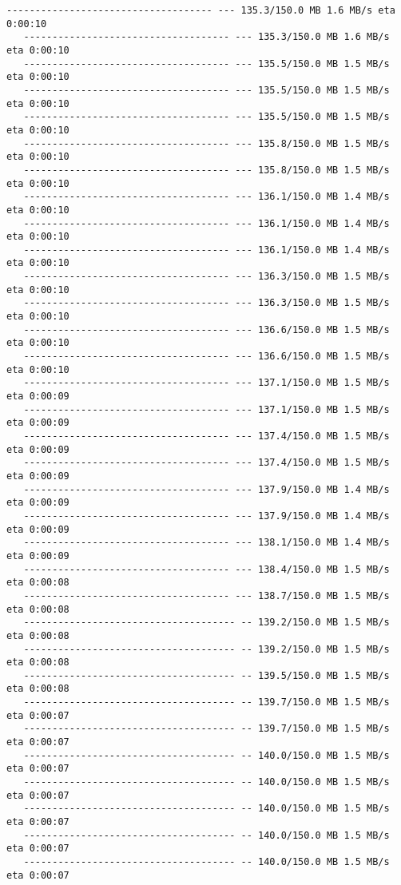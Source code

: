 \documentclass[11pt]{article}
\begin{document}
\begin{Verbatim}[commandchars=\\\{\}]
   ------------------------------------ --- 135.3/150.0 MB 1.6 MB/s eta 0:00:10
   ------------------------------------ --- 135.3/150.0 MB 1.6 MB/s eta 0:00:10
   ------------------------------------ --- 135.5/150.0 MB 1.5 MB/s eta 0:00:10
   ------------------------------------ --- 135.5/150.0 MB 1.5 MB/s eta 0:00:10
   ------------------------------------ --- 135.5/150.0 MB 1.5 MB/s eta 0:00:10
   ------------------------------------ --- 135.8/150.0 MB 1.5 MB/s eta 0:00:10
   ------------------------------------ --- 135.8/150.0 MB 1.5 MB/s eta 0:00:10
   ------------------------------------ --- 136.1/150.0 MB 1.4 MB/s eta 0:00:10
   ------------------------------------ --- 136.1/150.0 MB 1.4 MB/s eta 0:00:10
   ------------------------------------ --- 136.1/150.0 MB 1.4 MB/s eta 0:00:10
   ------------------------------------ --- 136.3/150.0 MB 1.5 MB/s eta 0:00:10
   ------------------------------------ --- 136.3/150.0 MB 1.5 MB/s eta 0:00:10
   ------------------------------------ --- 136.6/150.0 MB 1.5 MB/s eta 0:00:10
   ------------------------------------ --- 136.6/150.0 MB 1.5 MB/s eta 0:00:10
   ------------------------------------ --- 137.1/150.0 MB 1.5 MB/s eta 0:00:09
   ------------------------------------ --- 137.1/150.0 MB 1.5 MB/s eta 0:00:09
   ------------------------------------ --- 137.4/150.0 MB 1.5 MB/s eta 0:00:09
   ------------------------------------ --- 137.4/150.0 MB 1.5 MB/s eta 0:00:09
   ------------------------------------ --- 137.9/150.0 MB 1.4 MB/s eta 0:00:09
   ------------------------------------ --- 137.9/150.0 MB 1.4 MB/s eta 0:00:09
   ------------------------------------ --- 138.1/150.0 MB 1.4 MB/s eta 0:00:09
   ------------------------------------ --- 138.4/150.0 MB 1.5 MB/s eta 0:00:08
   ------------------------------------ --- 138.7/150.0 MB 1.5 MB/s eta 0:00:08
   ------------------------------------- -- 139.2/150.0 MB 1.5 MB/s eta 0:00:08
   ------------------------------------- -- 139.2/150.0 MB 1.5 MB/s eta 0:00:08
   ------------------------------------- -- 139.5/150.0 MB 1.5 MB/s eta 0:00:08
   ------------------------------------- -- 139.7/150.0 MB 1.5 MB/s eta 0:00:07
   ------------------------------------- -- 139.7/150.0 MB 1.5 MB/s eta 0:00:07
   ------------------------------------- -- 140.0/150.0 MB 1.5 MB/s eta 0:00:07
   ------------------------------------- -- 140.0/150.0 MB 1.5 MB/s eta 0:00:07
   ------------------------------------- -- 140.0/150.0 MB 1.5 MB/s eta 0:00:07
   ------------------------------------- -- 140.0/150.0 MB 1.5 MB/s eta 0:00:07
   ------------------------------------- -- 140.0/150.0 MB 1.5 MB/s eta 0:00:07

\end{Verbatim}
\end{document}
